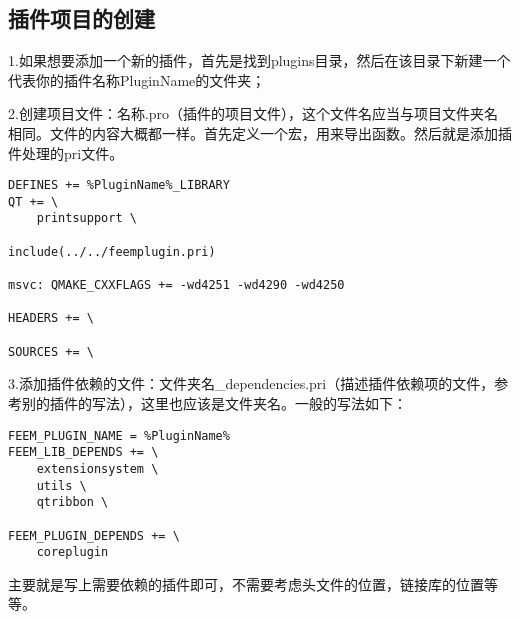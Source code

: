 \subsection{插件项目的创建}
1.如果想要添加一个新的插件，首先是找到plugins目录，然后在该目录下新建一个代表你的插件名称PluginName的文件夹；

2.创建项目文件：名称.pro（插件的项目文件），这个文件名应当与项目文件夹名相同。文件的内容大概都一样。首先定义一个宏，用来导出函数。然后就是添加插件处理的pri文件。
\begin{lstlisting}
DEFINES += %PluginName%_LIBRARY
QT += \
    printsupport \

include(../../feemplugin.pri)

msvc: QMAKE_CXXFLAGS += -wd4251 -wd4290 -wd4250

HEADERS += \

SOURCES += \

\end{lstlisting}

3.添加插件依赖的文件：文件夹名\_dependencies.pri（描述插件依赖项的文件，参考别的插件的写法），这里也应该是文件夹名。一般的写法如下：
\begin{lstlisting}
FEEM_PLUGIN_NAME = %PluginName%
FEEM_LIB_DEPENDS += \
    extensionsystem \
    utils \
    qtribbon \

FEEM_PLUGIN_DEPENDS += \
    coreplugin    
\end{lstlisting}
主要就是写上需要依赖的插件即可，不需要考虑头文件的位置，链接库的位置等等。

